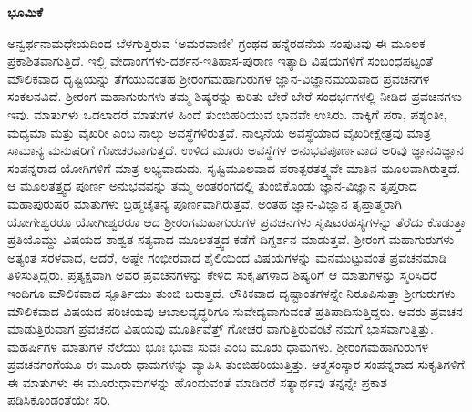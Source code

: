 \newpage

\begin{center}
{\Large\bf ಭೂಮಿಕೆ}
\end{center}
 
 ಅನ್ವರ್ಥನಾಮಧೇಯದಿಂದ ಬೆಳಗುತ್ತಿರುವ `ಅಮರವಾಣೀ' ಗ್ರಂಥದ ಹನ್ನೆರಡನೆಯ ಸಂಪುಟವು ಈ ಮೂಲಕ ಪ್ರಕಾಶಿತವಾಗುತ್ತಿದೆ. ಇಲ್ಲಿ ವೇದಾಂಗಗಳು-ದರ್ಶನ-ಇತಿಹಾಸ-ಪುರಾಣ ಇತ್ಯಾದಿ ವಿಷಯಗಳಿಗೆ ಸಂಬಂಧಪಟ್ಟಂತೆ ಮೌಲಿಕವಾದ ದೃಷ್ಟಿಯನ್ನು ತೆಗೆಯುವಂತಹ ಶ್ರೀರಂಗಮಹಾಗುರುಗಳ ಜ್ಞಾನ-ವಿಜ್ಞಾನಮಯವಾದ ಪ್ರವಚನಗಳ ಸಂಕಲನವಿದೆ. ಶ್ರೀರಂಗ ಮಹಾಗುರುಗಳು ತಮ್ಮ ಶಿಷ್ಯರನ್ನು ಕುರಿತು ಬೇರೆ ಬೇರೆ ಸಂಧರ್ಭಗಳಲ್ಲಿ ನೀಡಿದ ಪ್ರವಚನಗಳು ಇವು. ಮಾತುಗಳು ಒಡಲಾದರೆ ಮಾತುಗಳ ಹಿಂದೆ ತುಂಬಿಹರಿಯುವ ಭಾವವೇ ಉಸಿರು. ವಾಕ್ಕಿಗೆ ಪರಾ, ಪಶ್ಯಂತೀ, ಮಧ್ಯಮಾ ಮತ್ತು ವೈಖರೀ ಎಂಬ ನಾಲ್ಕು ಅವಸ್ಥೆಗಳಿರುತ್ತವೆ. ನಾಲ್ಕನೆಯ ಅವಸ್ಥೆಯಾದ ವೈಖರೀಕ್ಷೇತ್ರವು ಮಾತ್ರ ಸಾಮಾನ್ಯ ಮನುಷರಿಗೆ ಗೋಚರವಾಗುತ್ತದೆ. ಉಳಿದ ಮೂರು ಅವಸ್ಥೆಗಳ ಅನುಭವಪೂರ್ಣವಾದ ಅರಿವು ಜ್ಞಾನವಿಜ್ಞಾನ ಸಂಪನ್ನರಾದ ಯೋಗಿಗಳಿಗೆ ಮಾತ್ರ ಲಭ್ಯವಾದುದು. ಸೃಷ್ಟಿಮೂಲವಾದ ಪರಾತ್ಪರತತ್ತ್ವವೇ ಮಾತಿನ ಮೂಲವಾಗಿರುತ್ತದೆ. ಆ ಮೂಲತತ್ತ್ವದ ಪೂರ್ಣ ಅನುಭವವನ್ನು ತಮ್ಮ ಅಂತರಂಗದಲ್ಲಿ ತುಂಬಿಕೊಂಡು ಜ್ಞಾನ-ವಿಜ್ಞಾನ ತೃಪ್ತರಾದ ಮಹಾಪುರುಷರ ಮಾತುಗಳು ಬ್ರಹ್ಮಚೈತನ್ಯ ಪೂರ್ಣವಾಗಿರುತ್ತವೆ. ಅಂತಹ ಜ್ಞಾನ-ವಿಜ್ಞಾನ ತೃಪ್ತಾತ್ಮರಾಗಿ ಯೋಗೇಶ್ವರರೂ ಯೋಗೀಶ್ವರರೂ ಆದ ಶ್ರೀರಂಗಮಹಾಗುರುಗಳ ಪ್ರವಚನಗಳು ಸೃಷಿಟರಹಸ್ಯಗಳನ್ನು ತೆರೆದು ಕೊಡುತ್ತಾ ಪ್ರತಿಯೊಮ್ದು ವಿಷಯದ ಶಾಶ್ವತ ಸತ್ಯವಾದ ಮೂಲತತ್ತ್ವದ ಕಡೆಗೆ ದಿಗ್ದರ್ಶನ ಮಾಡುತ್ತವೆ. ಶ್ರೀರಂಗ ಮಹಾಗುರುಗಳು ಅತ್ಯಂತ ಸರಳವಾದ, ಆದರೆ, ಅಷ್ಟೇ ಗಂಭೀರವಾದ ಶೈಲಿಯಿಂದ ವಿಷಯಗಳನ್ನು ಮನಮುಟ್ಟುವಂತೆ ಪ್ರವಚನಮಾಡಿ ತಿಳಿಸುತ್ತಿದ್ದರು. ಪ್ರತ್ಯಕ್ಷವಾಗಿ ಅವರ ಪ್ರವಚನಗಳನ್ನು ಕೇಳಿದ ಸುಕೃತಿಗಳಾದ ಶಿಷ್ಯರಿಗೆ ಆ ಮಾತುಗಳನ್ನು ಸ್ಮರಿಸಿದರೆ ಇಂದಿಗೂ ಮೌಲಿಕವಾದ ಸ್ಪೂರ್ತಿಯು ತುಂಬಿ ಬರುತ್ತದೆ. ಲೌಕಿಕವಾದ ದೃಷ್ಟಾಂತಗಳನ್ನೇ ನಿರೂಪಿಸುತ್ತಾ ಶ್ರೀಗುರುಗಳು ಮೌಲಿಕವಾದ ವಿಷಯದ ಪರಿಚಯವು ಆಬಾಲವೃದ್ಧರಿಗೂ ಸುವೇದ್ಯವಾಗುವಂತೆ ಪ್ರತಿಪಾದಿಸುತ್ತಿದ್ದರು. ಅವರು ಪ್ರವಚನ ಮಾಡುತ್ತಿರುವಾಗ ಪ್ರವಚನದ ವಿಷಯವು ಮೂರ್ತಿವೆತ್ತ್ ಗೋಚರ ವಾಗುತ್ತಿರುವಂಟೆ ನಮಗೆ ಭಾಸವಾಗುತ್ತಿತ್ತು. ಮಹರ್ಷಿಗಳ ಮಾತುಗಳ ನೆಲೆಯು ಭೂಃ  ಭುವಃ ಸುವಃ ಎಂಬ ಮೂರು ಧಾಮಗಳು. ಶ್ರೀರಂಗಮಹಾಗುರುಗಳ ಪ್ರವಚನಗಂಗೆಯೂ ಈ ಮೂರು ಧಾಮಗಳನ್ನು ವ್ಯಾಪಿಸಿ ತುಂಬಿಹರಿಯುತ್ತಿತ್ತು. ಆತ್ಮಸಂಸ್ಕಾರ ಸಂಪನ್ನರಾದ ಸುಕೃತಿಗಳಿಗೆ ಈ ಮಾತುಗಳು ಈ ಮೂರುಧಾಮಗಳನ್ನು ಹೊಂದುವಂತೆ ಮಾಡಿದರೆ ಸತ್ಯಾರ್ಥವು ತನ್ನನ್ನೇ ಪ್ರಕಾಶ ಪಡಿಸಿಕೊಂಡಂತೆಯೇ ಸರಿ.

